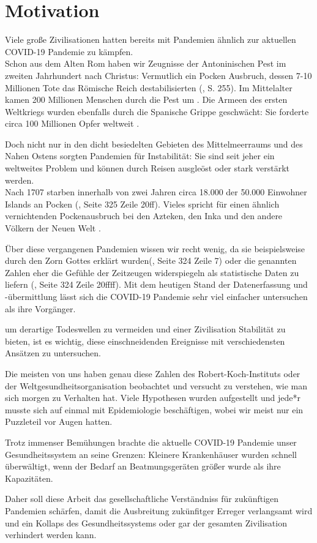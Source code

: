 \chapter{Motivation}\label{chap:Motivation}
Viele große Zivilisationen hatten bereits mit Pandemien ähnlich zur aktuellen COVID-19 Pandemie zu kämpfen.\\
Schon aus dem Alten Rom haben wir Zeugnisse der Antoninischen Pest im zweiten Jahrhundert nach Christus: Vermutlich ein Pocken Ausbruch, dessen 7-10 Millionen Tote das Römische Reich destabilisierten (\autocite{RomPest}, S. 255).
Im Mittelalter kamen 200 Millionen Menschen durch die Pest um \autocite{PestMittelalter}.
Die Armeen des ersten Weltkriegs wurden ebenfalls durch die Spanische Grippe geschwächt: Sie forderte circa 100 Millionen Opfer weltweit \autocite{SpanischeGrippe}.

Doch nicht nur in den dicht besiedelten Gebieten des Mittelmeerraums und des Nahen Ostens sorgten Pandemien für Instabilität: Sie sind seit jeher ein weltweites Problem und können durch Reisen ausgleöst oder stark verstärkt werden.\\
Nach 1707 starben innerhalb von zwei Jahren circa 18.000 der 50.000 Einwohner Islands an Pocken (\autocite{americaPandemics}, Seite 325 Zeile 20ff). Vieles spricht für einen ähnlich vernichtenden Pockenausbruch bei den Azteken, den Inka und den andere Völkern der Neuen Welt \autocite{americaPandemics}.

Über diese vergangenen Pandemien wissen wir recht wenig, da sie beispielsweise durch den Zorn Gottes erklärt wurden(\autocite{americaPandemics}, Seite 324 Zeile 7) oder die genannten Zahlen eher die Gefühle der Zeitzeugen widerspiegeln als statistische Daten zu liefern (\autocite{americaPandemics}, Seite 324 Zeile 20ffff). Mit dem heutigen Stand der Datenerfassung und -übermittlung lässt sich die COVID-19 Pandemie sehr viel einfacher untersuchen als ihre Vorgänger.

um derartige Todeswellen zu vermeiden und einer Zivilisation Stabilität zu bieten, ist es wichtig, diese einschneidenden Ereignisse mit verschiedensten Ansätzen zu untersuchen. 

Die meisten von uns haben genau diese Zahlen des Robert-Koch-Instituts oder der Weltgesundheitsorganisation beobachtet und versucht zu verstehen, wie man sich morgen zu Verhalten hat. Viele Hypothesen wurden aufgestellt und jede*r musste sich auf einmal mit Epidemiologie beschäftigen, wobei wir meist nur ein Puzzleteil vor Augen hatten.

Trotz immenser Bemühungen brachte die aktuelle COVID-19 Pandemie unser Gesundheitssystem an seine Grenzen: Kleinere Krankenhäuser wurden schnell überwältigt, wenn der Bedarf an Beatmungsgeräten größer wurde als ihre Kapazitäten.

Daher soll diese Arbeit das gesellschaftliche Verständniss für zukünftigen Pandemien schärfen, damit die Ausbreitung zukünfitger Erreger verlangsamt wird und ein Kollaps des Gesundheitssystems oder gar der gesamten Zivilisation verhindert werden kann.
